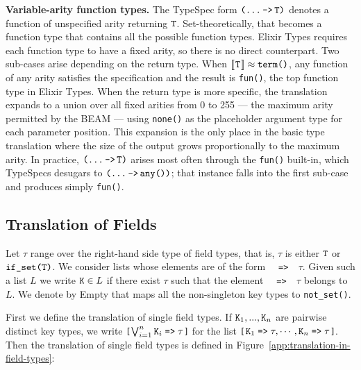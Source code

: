 \textbf{Variable-arity function types.}
The TypeSpec form $\texttt{(\dots\,\texttt{->}\,\texttt{T})}$ denotes a function of unspecified arity returning $\texttt{T}$.
Set-theoretically, that becomes a function type that contains all the possible function types.
Elixir Types requires each function type to have a fixed arity, so there is no direct counterpart.
Two sub-cases arise depending on the return type.
When $[\![\hspace{.07em}\texttt{T}\hspace{.07em}]\!] \approx \texttt{term()}$, any function of any arity satisfies the specification and the result is \texttt{fun()}, the top function type in Elixir Types.
When the return type is more specific, the translation expands to a union over all fixed arities from 0 to 255 --- the maximum arity permitted by the BEAM --- using \texttt{none()} as the placeholder argument type for each parameter position.
This expansion is the only place in the basic type translation where the size of the output grows proportionally to the maximum arity.
In practice, $\texttt{(\dots\,\texttt{->}\,\texttt{T})}$ arises most often through the \texttt{fun()} built-in, which TypeSpecs desugars to $\texttt{(\dots\,\texttt{->}\,\texttt{any()})}$; that instance falls into the first sub-case and produces simply \texttt{fun()}.



\subsection{Translation of Fields}


Let $\tau$ range over the right-hand side type of field types, that is, $\tau$ is either $\texttt{T}$ or $\texttt{if\_set(}{\texttt{T}}\texttt{)}$. 
We consider lists whose elements are of the form \texttt{\ETK\,\,=>\,\,$\tau$}. 
Given such a list $L$ we write $\texttt{K}\in L$ if there exist $\tau$ such that the element \texttt{\ETK\,\,=>\,\,$\tau$} belongs to $L$. 
We denote by \textsf{Empty} that maps all the non-singleton key types to \texttt{not\_set()}.

First we define the translation of single field types. 
If $\texttt{K}_1,...,\texttt{K}_n$ are pairwise distinct key types, we write \texttt{[$\bigvee_{i=1}^n \texttt{K}_i\;\texttt{=>}\;\tau$]} for the list \texttt{[$\texttt{K}_1\;\texttt{=>}\;\tau,\cdots,\texttt{K}_n\;\texttt{=>}\;\tau$]}. 
Then the translation of single field types is defined in Figure~\ref{app:translation-in-field-types}:


